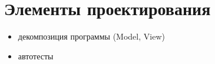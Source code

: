 \section{Элементы проектирования}
\begin{itemize}[noitemsep]
    \item декомпозиция программы (Model, View)
    \item автотесты
\end{itemize}

